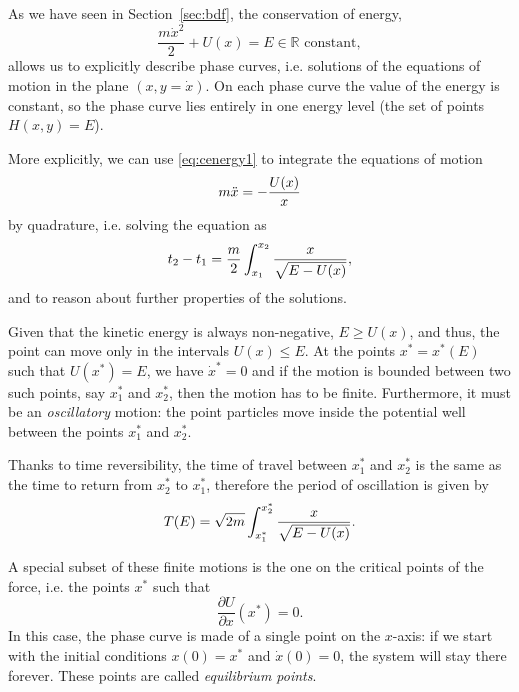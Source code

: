 \documentclass[english,fontsize=11pt,paper=a5,oneside]{scrbook}
\newcommand{\R}{\mathbb{R}}
\let\d\relax
\DeclareMathOperator{\d}{d}
\theoremstyle{definition}
\begin{document}
As we have seen in Section~\ref{sec:bdf}, the conservation of energy,
\begin{equation}\label{eq:cenergy1}
    \frac{m \dot x^2}{2} + U(x) = E \in\R \mbox{ constant},
\end{equation}
allows us to explicitly describe phase curves, i.e. solutions of the equations of motion in the plane $(x, y = \dot x)$.
On each phase curve the value of the energy is constant, so the phase curve lies entirely in one energy level (the set of points $H(x,y)=E$).

More explicitly, we can use \eqref{eq:cenergy1} to integrate the equations of motion
\begin{equation}
    m \ddot x = - \frac{\d U(x)}{\d x}
\end{equation}
by quadrature, i.e. solving the equation as
\begin{equation}
    t_2 - t_1 = \frac m2 \int_{x_1}^{x_2} \frac{\d x}{\sqrt{E-U(x)}},
\end{equation}
and to reason about further properties of the solutions.

Given that the kinetic energy is always non-negative, $E \geq U(x)$, and thus, the point can move only in the intervals $U(x) \leq E$.
At the points $x^* = x^*(E)$ such that $U(x^*) = E$, we have $\dot x^* = 0$ and if the motion is bounded between two such points, say $x_1^*$ and $x_2^*$, then the motion has to be finite.
Furthermore, it must be an \emph{oscillatory} motion: the point particles move inside the potential well between the points $x_1^*$ and $x_2^*$.

Thanks to time reversibility, the time of travel between $x_1^*$ and $x_2^*$ is the same as the time to return from $x_2^*$ to $x_1^*$, therefore the period of oscillation is given by
\begin{equation}\label{eq:osc}
    T(E) = \sqrt{2m} \int_{x^*_1}^{x^*_2} \frac{\d x}{\sqrt{E-U(x)}}.
\end{equation}

A special subset of these finite motions is the one on the critical points of the force, i.e. the points $x^*$ such that 
\begin{equation}
    \frac{\partial U}{\partial x}(x^*) = 0.
\end{equation}
In this case, the phase curve is made of a single point on the $x$-axis: if we start with the initial conditions $x(0) = x^*$ and $\dot x(0) = 0$, the system will stay there forever. These points are called \emph{equilibrium points}.
\end{document}
